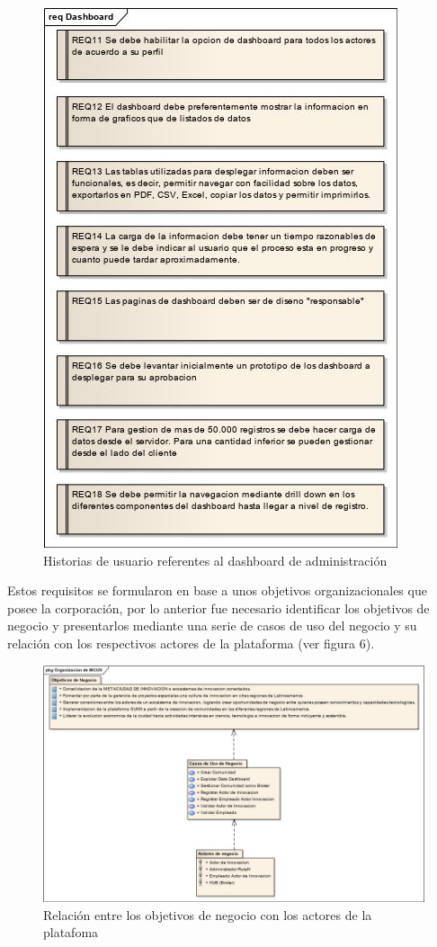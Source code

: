 \begin{figure}[ht]
	\includegraphics[scale=0.6, center]{images/dashboard.jpg}
	\caption{Historias de usuario referentes al dashboard de administración}
	\label{fig:img5}
\end{figure}

Estos requisitos se formularon en base a unos objetivos organizacionales que posee la
corporación, por lo anterior fue necesario identificar los objetivos de negocio y presentarlos
mediante una serie de casos de uso del negocio y su relación con los respectivos actores de
la plataforma (ver figura 6).\\

\begin{figure}[ht]
	\includegraphics[scale=0.6, center]{images/negocio.jpg}
	\caption{Relación entre los objetivos de negocio con los actores de la platafoma}
	\label{fig:img6}
\end{figure}

